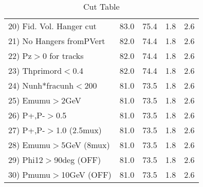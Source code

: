 \begin{table}[h!]
\begin{tabular}{||l||r|r|r|r||}
 20) Fid. Vol. Hanger cut &        83.0 &        75.4 &         1.8 &         2.6 \\
 21) No Hangers fromPVert &        82.0 &        74.4 &         1.8 &         2.6 \\
 22) Pz$>$0 for tracks    &        82.0 &        74.4 &         1.8 &         2.6 \\
 23) Thprimord$<$0.4      &        82.0 &        74.4 &         1.8 &         2.6 \\
 24) Nunh*fracunh$<$200   &        81.0 &        73.5 &         1.8 &         2.6 \\
 25) Emumu$>$2GeV         &        81.0 &        73.5 &         1.8 &         2.6 \\
 26) P+,P-$>$0.5          &        81.0 &        73.5 &         1.8 &         2.6 \\
 27) P+,P-$>$1.0 (2.5mux) &        81.0 &        73.5 &         1.8 &         2.6 \\
 28) Emumu$>$5GeV  (8mux) &        81.0 &        73.5 &         1.8 &         2.6 \\
 29) Phi12$>$90deg  (OFF) &        81.0 &        73.5 &         1.8 &         2.6 \\
 30) Pmumu$>$10GeV  (OFF) &        81.0 &        73.5 &         1.8 &         2.6 \\
 \hline
 \hline
 \end{tabular}
 \caption{Cut Table \cohpip }
 \label{tab-cut_copip}
 \end{table}
